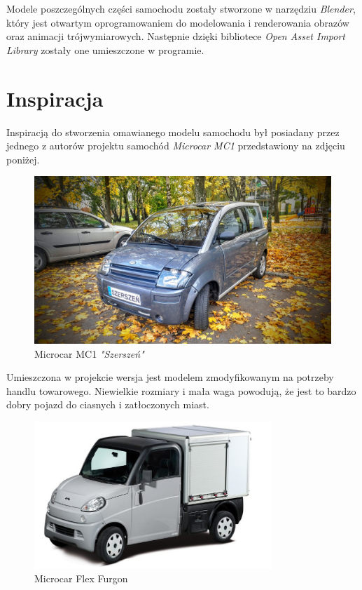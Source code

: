 \documentclass[a4paper,12pt]{article}
\numberwithin{equation}{section}
\begin{document}
Modele poszczególnych części samochodu zostały stworzone w narzędziu \textit{Blender}, który jest otwartym oprogramowaniem do modelowania i renderowania obrazów oraz animacji trójwymiarowych. Następnie dzięki bibliotece \textit{Open Asset Import Library} zostały one umieszczone w programie.


\section{Inspiracja}
Inspiracją do stworzenia omawianego modelu samochodu był posiadany przez jednego z autorów projektu samochód \textit{Microcar MC1} przedstawiony na zdjęciu poniżej.
\begin{figure}[h!]
    \centering
    \includegraphics[width=\textwidth]{szerszen.jpg}
    \caption{Microcar MC1 \textit{"Szerszeń"}}
    \label{fig:szerszen}
    \vspace{1cm}
\end{figure}

Umieszczona w projekcie wersja jest modelem zmodyfikowanym na potrzeby handlu towarowego. Niewielkie rozmiary i mała waga powodują, że jest to bardzo dobry pojazd do ciasnych i zatłoczonych miast.
\begin{figure}[h!]
    \centering
    \includegraphics[width=0.8\textwidth]{furgon.jpg}
    \caption{Microcar Flex Furgon}
    \label{fig:furgon}
\end{figure}
\end{document}
